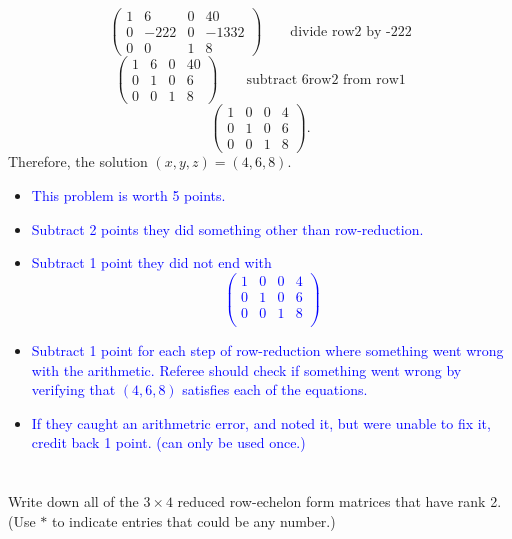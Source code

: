 \documentclass[10pt,twoside]{article}
\begin{document}
\[\begin{pmatrix}
1 & 6 & 0 & 40\\
0 & -222 & 0 & -1332\\
0 & 0 & 1 & 8
\end{pmatrix} \qquad\text{divide row2 by -222}\]
\[\begin{pmatrix}
1 & 6 & 0 & 40\\
0 & 1 & 0 & 6\\
0 & 0 & 1 & 8
\end{pmatrix} \qquad\text{subtract 6row2 from row1}\]
\[\begin{pmatrix}
1 & 0 & 0 & 4\\
0 & 1 & 0 & 6\\
0 & 0 & 1 & 8
\end{pmatrix}.\]
Therefore, the solution $(x,y,z) = (4,6,8)$.


\begin{itemize}
\item\textcolor{blue}{This problem is worth 5 points.}
\item\textcolor{blue}{Subtract 2 points they did something other than
row-reduction.}
\item\textcolor{blue}{Subtract 1 point they did not end with 
\[ \begin{pmatrix}1 & 0 & 0 & 4\\0 & 1 & 0 & 6\\ 0 & 0 & 1 & 8\\
\end{pmatrix}\]}
\item\textcolor{blue}{Subtract 1 point for each step of row-reduction where
something went wrong with the arithmetic.  Referee should check if something went wrong by verifying that
$(4,6,8)$ satisfies each of the equations.}
\item \textcolor{blue}{If they caught an arithmetric error, and noted it, but
were unable to fix it, credit back 1 point.  (can only be used once.)}
\end{itemize}


\section{ }
{\color{red}Write down all of the $3 \times 4$ reduced row-echelon form matrices that have
rank 2.\\
(Use $\ast$ to indicate entries that could be any number.)}
\end{document}
